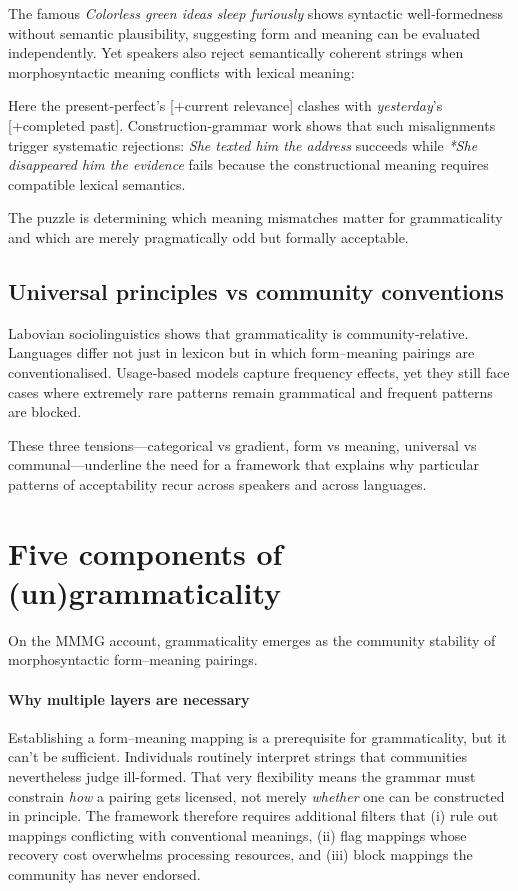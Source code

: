 \documentclass[12pt]{article}
\begin{document}
The famous \textit{Colorless green ideas sleep furiously} shows syntactic well‑formedness without semantic plausibility, suggesting form and meaning can be evaluated independently. Yet speakers also reject semantically coherent strings when morphosyntactic meaning conflicts with lexical meaning:

\z

Here the present‑perfect's [+current relevance] clashes with \textit{yesterday}'s [+completed past]. Construction‑grammar work \parencite{goldberg1995constructions} shows that such misalignments trigger systematic rejections: \textit{She texted him the address} succeeds while \textit{*She disappeared him the evidence} fails because the constructional meaning requires compatible lexical semantics.

The puzzle is determining which meaning mismatches matter for grammaticality and which are merely pragmatically odd but formally acceptable.

\subsection{Universal principles vs community conventions}

Labovian sociolinguistics \parencite{labov1972} shows that grammaticality is community‑relative.  Languages differ not just in lexicon but in which form–meaning pairings are conventionalised.  Usage‑based models capture frequency effects, yet they still face cases where extremely rare patterns remain grammatical and frequent patterns are blocked.

\medskip
These three tensions—categorical vs gradient, form vs meaning, universal vs communal—underline the need for a framework that explains why particular patterns of acceptability recur across speakers and across languages.


\section{Five components of (un)grammaticality}

On the MMMG account, grammaticality emerges as the community stability of morphosyntactic form–meaning pairings.

\paragraph{Why multiple layers are necessary}
Establishing a form–meaning mapping is a prerequisite for grammaticality, but it can't be sufficient. Individuals routinely interpret strings that communities nevertheless judge ill-formed. That very flexibility means the grammar must constrain \emph{how} a pairing gets licensed, not merely \emph{whether} one can be constructed in principle. The framework therefore requires additional filters that (i) rule out mappings conflicting with conventional meanings, (ii) flag mappings whose recovery cost overwhelms processing resources, and (iii) block mappings the community has never endorsed.
\end{document}

